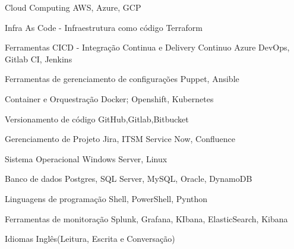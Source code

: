 

\begin{cvskills}

  \cvskill
    {Cloud Computing} %
    {AWS, Azure, GCP} %

  \cvskill
    {Infra As Code - Infraestrutura como código} %
    {Terraform} %

  \cvskill
    {Ferramentas CICD - Integração Continua e Delivery Continuo} %
    {Azure DevOps, Gitlab CI, Jenkins} %

  \cvskill
    {Ferramentas de gerenciamento de configurações} %
    {Puppet, Ansible} %

  \cvskill
    {Container e Orquestração} %
    {Docker; Openshift, Kubernetes} %

  \cvskill
    {Versionamento de código} %
    {GitHub,Gitlab,Bitbucket} %

  \cvskill
    {Gerenciamento de Projeto} %
    {Jira, ITSM Service Now, Confluence} %

  \cvskill
    {Sistema Operacional} %
    {Windows Server, Linux} %

  \cvskill
    {Banco de dados} %
    {Postgres, SQL Server, MySQL, Oracle, DynamoDB} %

  \cvskill
    {Linguagens de programação} %
    {Shell, PowerShell, Pynthon} %

  \cvskill
    {Ferramentas de monitoração} %
    {Splunk, Grafana, KIbana, ElasticSearch, Kibana} %

  \cvskill
    {Idiomas} %
    {Inglês(Leitura, Escrita e Conversação)} %

\end{cvskills}
